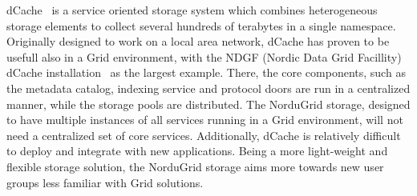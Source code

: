 \documentclass{llncs}
\begin{document}
dCache~\cite{dCache} is a service oriented storage system which combines heterogeneous storage
elements to collect several hundreds of terabytes in a single
namespace. Originally designed to work on a local area network,
dCache has proven to be usefull also in a Grid environment, with the
NDGF (Nordic Data Grid Facillity) dCache
installation~\cite{DSSWithdCache} as the largest example. There, the
core components, such as the metadata catalog, indexing service and
protocol doors are run in a centralized manner, while the storage
pools are distributed. The
NorduGrid storage, designed to have multiple instances of all
services running in a Grid environment, will not need a centralized
set of core services. Additionally, dCache is relatively difficult to
deploy and integrate with new applications. Being a more light-weight and flexible
storage solution, the NorduGrid storage aims more towards new user
groups less familiar with Grid solutions.
\end{document}
